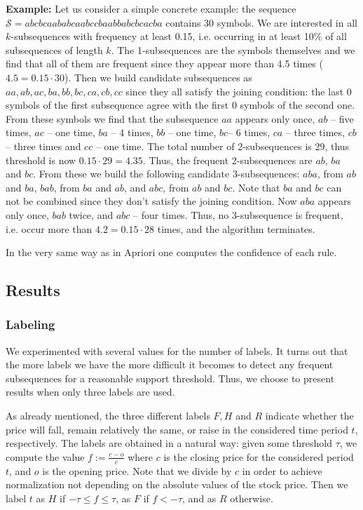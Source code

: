 \documentclass[10pt]{article}
\begin{document}
{\bf Example:}  Let us consider a simple concrete example: the sequence $\mathcal{S} = abcbca ababca abccba abbabc bcacba$ contains 30 symbols. We are interested in all $k$-subsequences with frequency at least 0.15, i.e. occurring in at least 10\% of all subsequences of length $k$. The 1-subsequences are the symbols themselves and we find that all of them are frequent since they appear more than 4.5 times ($4.5 = 0.15\cdot 30$). Then we build candidate subsequences as $aa, ab, ac, ba, bb, bc, ca, cb, cc$ since they all satisfy the joining condition: the last 0 symbols of the first subsequence agree with the first 0 symbols of the second one. From these symbols we find that the subsequence $aa$ appears only once, $ab$ -- five times, $ac$ -- one time, $ba$ -- 4 times, $bb$ -- one time, $bc$-- 6 times, $ca$ -- three times, $cb$-- three times and $cc$ -- one time. The total number of 2-subsequences is 29, thus threshold is now $0.15 \cdot 29 = 4.35$. Thus, the frequent 2-subsequences are $ab$, $ba$ and $bc$. From these we build the following candidate 3-subsequences: $aba$, from $ab$ and $ba$, $bab$, from $ba$ and $ab$, and $abc$, from $ab$ and $bc$. Note that $ba$ and $bc$ can not be combined since they don't satisfy the joining condition. Now $aba$ appears only once, $bab$ twice, and $abc$ -- four times. Thus, no 3-subsequence is frequent, i.e. occur more than $4.2 = 0.15\cdot 28$ times, and the algorithm terminates.

In the very same way as in Apriori one computes the confidence of each rule.

\subsection{Results}
\subsubsection{Labeling}
We experimented with several values for the number of labels. It turns out that the more labels we have the more difficult it becomes to detect any frequent subsequences for a reasonable support threshold. Thus, we choose to present results when only three labels are used.  

As already mentioned, the three different labels $F, H$ and $R$ indicate whether the price will fall, remain relatively the same, or raise in the considered time period $t$, respectively. The labels are obtained in a natural way: given some threshold $\tau$, we compute the value $f:=\frac{c-o}{c}$ where $c$ is the closing price for the considered period $t$, and $o$ is the opening price. Note that we divide by $c$ in order to achieve normalization not depending on the absolute values of the stock price. Then we label $t$ as $H$ if $-\tau \leq f \leq \tau$, as $F$ if $f < -\tau$, and as $R$ otherwise. 
\end{document}

